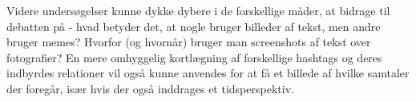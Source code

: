 Videre undersøgelser kunne dykke dybere i de forskellige måder, at 
bidrage til debatten på - hvad betyder det, at nogle bruger 
billeder af tekst, men andre bruger memes? Hvorfor (og hvornår) 
bruger man screenshots af tekst over fotografier? En mere 
omhyggelig kortlægning af forskellige hashtags og deres indbyrdes 
relationer vil også kunne anvendes for at få et billede af hvilke 
samtaler der foregår, især hvis der også inddrages et 
tidsperspektiv.

